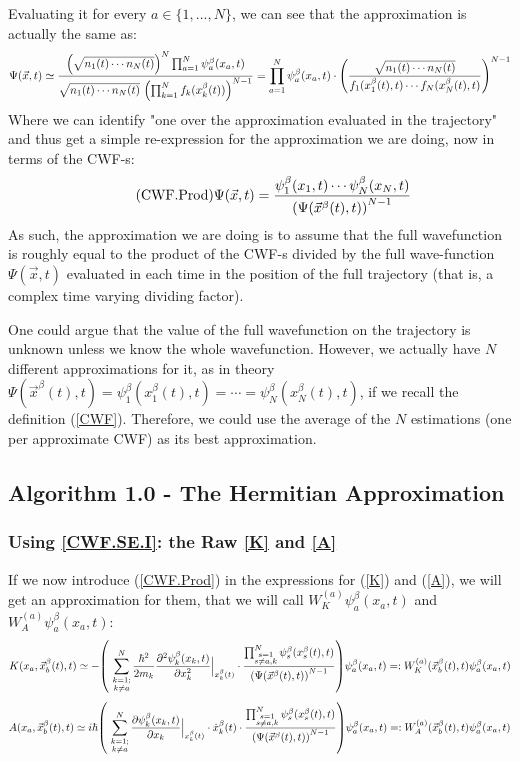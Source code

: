 \documentclass[11pt, a4paper]{article} %
\newcommand{\s}{\mathbb{S}}
\begin{document}
Evaluating it for every $a\in \{1,...,N\}$, we can see that the approximation is actually the same as:
$$
\Psi(\vec{x}, t)\simeq \frac{ \qty(\sqrt{n_1(t)\cdots n_N(t)})^N\prod_{a=1}^N \psi_a^\beta(x_a,t)}{\sqrt{n_1(t)\cdots n_N(t)}\ \qty(\prod_{\substack{k=1}}^{N} f_k(x_k^\beta(t)))^{N-1}} = \prod_{a=1}^N \psi_a^\beta(x_a,t) \cdot \qty(\frac{\sqrt{n_1(t)\cdots n_N(t)}}{f_1(x_1^\beta(t),t)\cdots f_N(x_N^\beta(t),t)})^{N-1}
$$
Where we can identify "one over the approximation evaluated in the trajectory" and thus get a simple re-expression for the approximation we are doing, now in terms of the CWF-s:
\begin{equation}\label{CWF.Prod}\tag{CWF.Prod}
\Psi(\vec{x},t)= \frac{\psi_1^\beta(x_1,t)\cdots \psi_N^\beta(x_N,t)}{\qty(\Psi(\vec{x}^\beta(t),t))^{N-1}}
\end{equation}
As such, the approximation we are doing is to assume that the full wavefunction is roughly equal to the product of the CWF-s divided by the full wave-function $\Psi(\vec{x},t)$ evaluated in each time in the position of the full trajectory (that is, a complex time varying dividing factor). 

One could argue that the value of the full wavefunction on the trajectory is unknown unless we know the whole wavefunction. However, we actually have $N$ different approximations for it, as in theory $\Psi(\vec{x}^\beta(t),t)=\psi^\beta_1(x_1^\beta(t),t)=\cdots=\psi^\beta_N(x_N^\beta(t),t)$, if we recall the definition (\ref{CWF}). Therefore, we could use the average of the $N$ estimations (one per approximate CWF) as its best approximation.

\subsection{Algorithm 1.0 - The Hermitian Approximation}
\subsubsection{Using \ref{CWF.SE.I}: the Raw \ref{K} and \ref{A}}

If we now introduce (\ref{CWF.Prod}) in the expressions for (\ref{K}) and (\ref{A}), we will get an approximation for them, that we will call $W^{(a)}_K\psi_a^\beta(x_a,t)$ and $W^{(a)}_A\psi_a^\beta(x_a,t)$:
$$
K(x_a, \vec{x}_b^\beta(t), t) \simeq - \qty(\ \sum_{\substack{k=1; \\ k\neq a}}^{N} \frac{\hbar^2}{2m_k}\pdv[2]{\psi_k^\beta(x_k,t)}{x_k}\Big\rvert_{x_k^\beta(t)}\cdot\frac{\prod_{\substack{s=1\\s\neq a,k}}^{N} \psi_s^\beta(x_s^\beta(t),t) }{\qty(\Psi(\vec{x}^\beta(t),t))^{N-1}} )\psi_a^\beta(x_a,t) =: W^{(a)}_K(\vec{x}_b^\beta (t),t)\psi_a^\beta(x_a,t)
$$
$$
A(x_a, \vec{x}_b^\beta(t), t) \simeq i\hbar \qty(\ \sum_{\substack{k=1; \\ k\neq a}}^{N} \pdv{\psi_k^\beta(x_k,t)}{x_k}\Big\rvert_{x_k^\beta(t)}\cdot \dot{x}_k^\beta(t) \cdot\frac{\prod_{\substack{s=1\\s\neq a,k}}^{N} \psi_s^\beta(x_s^\beta(t),t) }{\qty(\Psi(\vec{x}^\beta(t),t))^{N-1}} )\psi_a^\beta(x_a,t) =: W^{(a)}_A(\vec{x}_b^\beta (t),t)\psi_a^\beta(x_a,t)
$$
\end{document}
